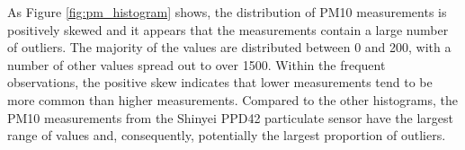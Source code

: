 \documentclass[11pt,twosided,a4paper]{report}
\begin{document}

As Figure \ref{fig:pm_histogram} shows, the distribution of PM10 measurements is positively skewed and it appears that the measurements contain a large number of outliers. The majority of the values are distributed between 0 and 200, with a number of other values spread out to over \num{1500}. Within the frequent observations, the positive skew indicates that lower measurements tend to be more common than higher measurements. Compared to the other histograms, the PM10 measurements from the Shinyei PPD42 particulate sensor have the largest range of values and, consequently, potentially the largest proportion of outliers.
\end{document}
